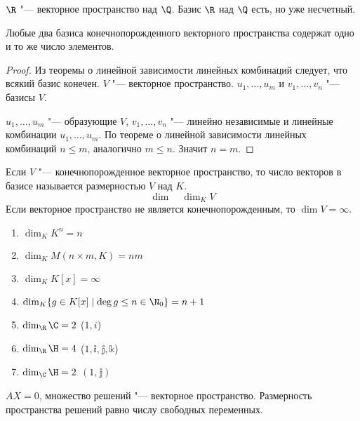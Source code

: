 \begin{exmp}
	$\R$ "--- векторное пространство над $\Q$.
	Базис $\R$ над $\Q$ есть, но уже несчетный.
\end{exmp}

\begin{theorem}
	Любые два базиса конечнопорожденного векторного пространства содержат одно и то же
	число элементов.
\end{theorem}

\begin{proof}
	Из теоремы о линейной зависимости линейных комбинаций следует, что всякий базис конечен.
	$V$ "--- векторное пространство.
	$u_1, \dots, u_m$ и $v_1, \dots, v_n$ "--- базисы $V$.

	$u_1, \dots, u_m$ "--- образующие $V$, $v_1, \dots, v_n$ "--- линейно независимые и линейные комбинации $u_1, \dots, u_m$.
	По теореме о линейной зависимости линейных комбинаций $n \le m$, аналогично $m \le n$.
	Значит $n = m$.
\end{proof}

\begin{Def}
	Если $V$ "--- конечнопорожденное векторное пространство, то число векторов в базисе
	называется размерностью $V$ над $K$.
	\[\dim  \quad \dim_K V \]
	Если векторное пространство не является конечнопорожденным, то $\dim V = \infty$.
\end{Def}

\begin{exmp}
	\begin{enumerate}
		\item $\dim_K K^n = n$
		\item $\dim_K M(n \times m, K) = nm$
		\item $\dim_K K[x] = \infty$
		\item $\dim_{K}\{g \in K[x] \mid \deg g \le n \in \N_{0}\} = n + 1$
		\item $\dim_{\R}\C = 2$ ($1, i$)
		\item $\dim_{\R}\H = 4$ ($1, \mathbb{i}, \mathbb{j}, \mathbb{k}$)
		\item $\dim_{\C}\H = 2$ $(1, \mathbb{j})$
	\end{enumerate}
\end{exmp}

$AX = 0$, множество решений "--- векторное пространство.
Размерность пространства решений равно числу свободных переменных.
